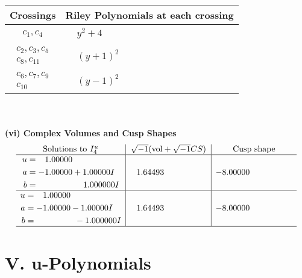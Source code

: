 \documentclass[1p]{elsarticle_modified}
\theoremstyle{definition}
\newcommand{\I}{\sqrt{-1}}
\begin{document}
\begin{tabular}{m{50pt}|m{274pt}}
Crossings & \hspace{64pt}Riley Polynomials at each crossing \\
\hline $$\begin{aligned}c_{1},c_{4}\end{aligned}$$&$\begin{aligned}
&y^2+4
\end{aligned}$\\
\hline $$\begin{aligned}c_{2},c_{3},c_{5}\\c_{8},c_{11}\end{aligned}$$&$\begin{aligned}
&(y+1)^2
\end{aligned}$\\
\hline $$\begin{aligned}c_{6},c_{7},c_{9}\\c_{10}\end{aligned}$$&$\begin{aligned}
&(y-1)^2
\end{aligned}$\\
\hline
\end{tabular}\\~\\
\newpage\flushleft \textbf{(vi) Complex Volumes and Cusp Shapes}
$$\begin{array}{c|c|c}  
\text{Solutions to }I^u_{4}& \I (\text{vol} + \sqrt{-1}CS) & \text{Cusp shape}\\
 \hline 
\begin{aligned}
u &= \phantom{-}1.00000\phantom{ +0.000000I} \\
a &= -1.00000 + 1.00000 I \\
b &= \phantom{-0.000000 -}1.000000 I\end{aligned}
 & \phantom{-}1.64493\phantom{ +0.000000I} & -8.00000\phantom{ +0.000000I} \\ \hline\begin{aligned}
u &= \phantom{-}1.00000\phantom{ +0.000000I} \\
a &= -1.00000 - 1.00000 I \\
b &= \phantom{-0.000000 } -1.000000 I\end{aligned}
 & \phantom{-}1.64493\phantom{ +0.000000I} & -8.00000\phantom{ +0.000000I}\\
 \hline 
 \end{array}$$\newpage
\newpage\renewcommand{\arraystretch}{1}
\centering \section*{ V. u-Polynomials}
\end{document}
